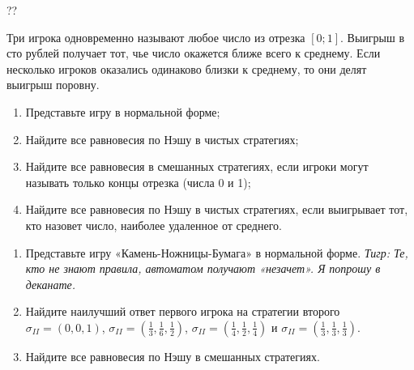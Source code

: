 \begin{problem}\par
\begin{source} \cite{cramton:lectures}?? \end{source}
Три игрока одновременно называют любое число из отрезка  $\left[0;1\right]$. Выигрыш в сто рублей получает тот, чье число окажется ближе всего к среднему. Если несколько игроков оказались одинаково близки к среднему, то они делят выигрыш поровну.\par
\begin{enumerate}
\item 	Представьте игру в нормальной форме;\par
\item 	Найдите все равновесия по Нэшу в чистых стратегиях;\par
\item 	Найдите все равновесия в смешанных стратегиях, если игроки могут называть только концы отрезка (числа 0 и 1);\par
\item	        Найдите все равновесия по Нэшу в чистых стратегиях, если выигрывает тот, кто назовет число, наиболее удаленное от среднего.
\end{enumerate}


\begin{sol}

\end{sol}
\end{problem}



\begin{problem}
\begin{enumerate}
\item 	Представьте игру «Камень-Ножницы-Бумага» в нормальной форме. {\it Тигр: Те, кто не знают правила, автоматом получают «незачет». Я попрошу в деканате.}\par
\item 	Найдите наилучший ответ первого игрока на стратегии второго  $\sigma _{II} =\left(0,0,1\right)$,  $\sigma _{II} =\left(\frac{1}{3},\frac{1}{6},\frac{1}{2} \right)$,  $\sigma _{II} =\left(\frac{1}{4},\frac{1}{2},\frac{1}{4} \right)$  и  $\sigma _{II} =\left(\frac{1}{3},\frac{1}{3},\frac{1}{3} \right)$.\par
\item 	Найдите все равновесия по Нэшу в смешанных стратегиях.
\end{enumerate}

\begin{sol}

\end{sol}
\end{problem}



